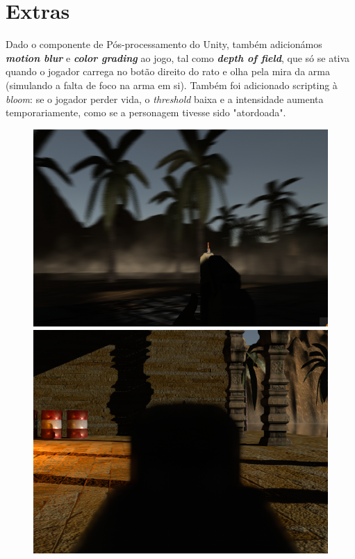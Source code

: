\documentclass{article}
\begin{document}
    \section*{Extras}
        \par
        Dado o componente de Pós-processamento do Unity, também adicionámos \textbf{\textit{motion blur}} e \textbf{\textit{color grading}} ao jogo, tal como \textbf{\textit{depth of field}}, que só se ativa quando o jogador carrega no botão direito do rato e olha pela mira da arma (simulando a falta de foco na arma em si). Também foi adicionado scripting à \textit{bloom}: se o jogador perder vida, o \textit{threshold} baixa e a intensidade aumenta temporariamente, como se a personagem tivesse sido "atordoada".
        \begin{figure}[h]\begin{center}
            \includegraphics[scale=0.3]{Screenshot_13.png}
            \includegraphics[scale=0.315]{Screenshot_15.png}

\end{center}
\end{figure}
\end{document}
